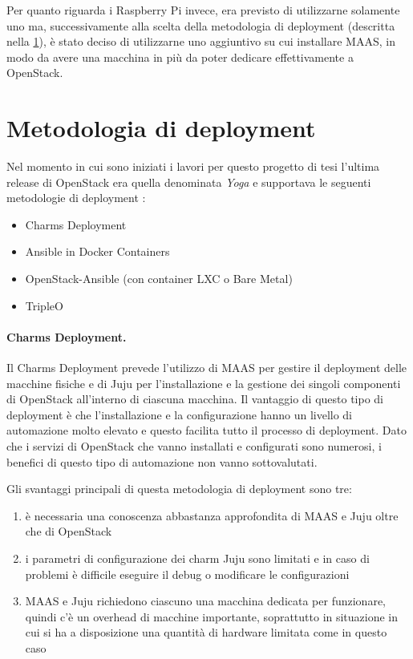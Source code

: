 Per quanto riguarda i Raspberry Pi invece, era previsto di utilizzarne solamente uno ma, successivamente alla scelta della metodologia di deployment (descritta nella \cref{sec:deplyoment_method}), è stato deciso di utilizzarne uno aggiuntivo su cui installare MAAS, in modo da avere una macchina in più da poter dedicare effettivamente a OpenStack.

\section{Metodologia di deployment}\label{sec:deplyoment_method}

Nel momento in cui sono iniziati i lavori per questo progetto di tesi l'ultima release di OpenStack era quella denominata \emph{Yoga} e supportava le seguenti metodologie di deployment \cite{openstack_deployment_guides}:
\begin{itemize}
    \item Charms Deployment
    \item Ansible in Docker Containers
    \item OpenStack-Ansible (con container LXC o Bare Metal)
    \item TripleO
\end{itemize}

\paragraph{Charms Deployment.}\label{sec:charms_deployment} Il Charms Deployment prevede l'utilizzo di MAAS per gestire il deployment delle macchine fisiche e di Juju per l'installazione e la gestione dei singoli componenti di OpenStack all'interno di ciascuna macchina. Il vantaggio di questo tipo di deployment è che l'installazione e la configurazione hanno un livello di automazione molto elevato e questo facilita tutto il processo di deployment. Dato che i servizi di OpenStack che vanno installati e configurati sono numerosi, i benefici di questo tipo di automazione non vanno sottovalutati.

Gli svantaggi principali di questa metodologia di deployment sono tre:
\begin{enumerate}
    \item è necessaria una conoscenza abbastanza approfondita di MAAS e Juju oltre che di OpenStack 
    \item i parametri di configurazione dei charm Juju sono limitati e in caso di problemi è difficile eseguire il debug o modificare le configurazioni
    \item MAAS e Juju richiedono ciascuno una macchina dedicata per funzionare, quindi c'è un overhead di macchine importante, soprattutto in situazione in cui si ha a disposizione una quantità di hardware limitata come in questo caso
\end{enumerate}

